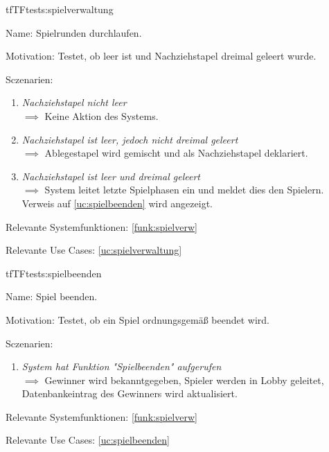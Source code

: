\begin{description}[leftmargin=5em, style=sameline]
\begin{lhp}{tf}{TF}{tests:spielverwaltung}
	\item [Name:] Spielrunden durchlaufen.
	\item [Motivation:] Testet, ob leer ist und Nachziehstapel dreimal geleert wurde.
	\item [Sczenarien:] \hfill
	\begin{enumerate}
		\item \textit{Nachziehstapel nicht leer} \\ $\implies$ Keine Aktion des Systems.
		\item \textit{Nachziehstapel ist leer, jedoch nicht dreimal geleert} \\ $\implies$ Ablegestapel wird gemischt und als Nachziehstapel deklariert.
		\item \textit{Nachziehstapel ist leer und dreimal geleert} \\ $\implies$ System leitet letzte Spielphasen ein und meldet dies den Spielern. Verweis auf \ref{uc:spielbeenden} wird angezeigt.
	\end{enumerate}
	\item [Relevante Systemfunktionen:] \ref{funk:spielverw}
	\item [Relevante Use Cases:] \ref{uc:spielverwaltung}
\end{lhp}

\begin{lhp}{tf}{TF}{tests:spielbeenden}
	\item [Name:] Spiel beenden.
	\item [Motivation:] Testet, ob ein Spiel ordnungsgemäß beendet wird.
	\item [Sczenarien:] \hfill
	\begin{enumerate}
		\item \textit{System hat Funktion "{}Spielbeenden"{} aufgerufen} \\ $\implies$ Gewinner wird bekanntgegeben, Spieler werden in Lobby geleitet, Datenbankeintrag des Gewinners wird aktualisiert.
	\end{enumerate}
	\item [Relevante Systemfunktionen:] \ref{funk:spielverw}
	\item [Relevante Use Cases:] \ref{uc:spielbeenden}
\end{lhp}


\end{description}
